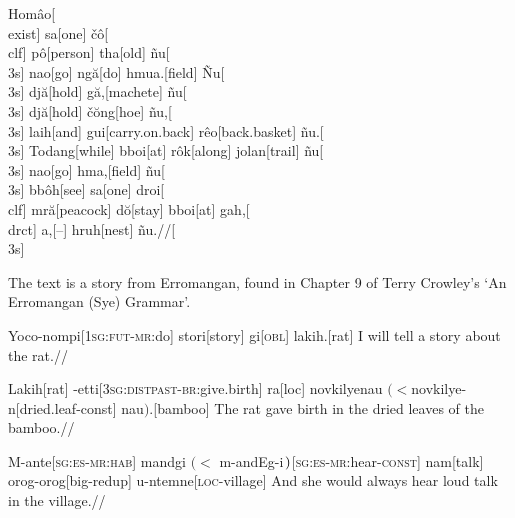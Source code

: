\documentclass[12pt]{article}
\begin{document}

Hom\^{a}o[\\{exist}]
sa[one]
\v{c}\^{o}[\\{clf}]
p\^{o}[person]
tha[old]
\~{n}u[\\{3s}]
nao[go]
ng\u{a}[do]
hmua.[field]
\~{N}u[\\{3s}]
dj\u{a}[hold]
g\u{a},[machete]
\~{n}u[\\{3s}]
dj\u{a}[hold]
\v{c}\u{o}ng[hoe]
\~{n}u,[\\{3s}]
laih[and]
gui[carry.on.back]
r\^{e}o[back.basket]
\~{n}u.[\\{3s}]
Todang[while]
bboi[at]
r\^{o}k[along]
jolan[trail]
\~{n}u[\\{3s}]
nao[go]
hma,[field]
\~{n}u[\\{3s}]
bb\^{o}h[see]
sa[one]
droi[\\{clf}]
mr\u{a}[peacock]
d\u{o}[stay]
bboi[at]
gah,[\\{drct}]
a,[--]
hruh[nest]
\~{n}u.//[\\{3s}]



\bigskip

\noindent
%
%
%
%
%
%
%
%
%
%
%
The text is a story from Erromangan, found in Chapter 9 of Terry
Crowley's `An Erromangan (Sye) Grammar'.

\bigskip
\exdisplay
\begingl
Yoco-nompi[\textsc{1sg:fut-mr:}do]
stori[story]
gi[\textsc{obl}]
lakih.[rat]
\endilg
\glft I will tell a story about the rat.//
\endgl
 \xe

\exdisplay
\begingl
Lakih[rat]
-etti[\textsc{3sg:distpast-br:}give.birth]
ra[\sc loc]
{novkilyenau $(<$novkilye-n}[dried.leaf-\sc const]
nau$)$.[bamboo]
\endilg
\glft The rat gave birth in the dried leaves of the bamboo.//
\endgl
\xe

\exdisplay\begingl
M-ante[\textsc{sg:es-mr:hab}]
{mandgi $(<$ m-andEg-i$\mskip2mu)$}[\textsc{sg:es-mr:}hear-\textsc{const}]
nam[talk]
orog-orog[big-\sc redup]
u-ntemne[\textsc{loc}-village]
\endilg
\glft And she would always hear loud talk in the village.//
\endgl
\xe
\end{document}
